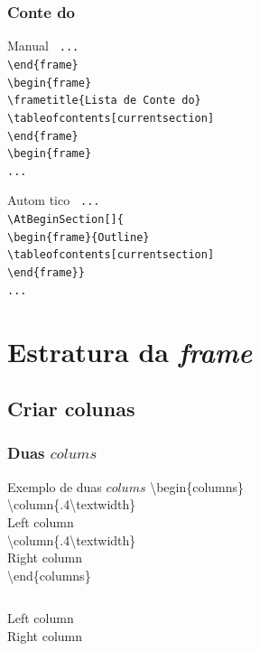 \documentclass{article}
\begin{document}
\begin{frame}
\frametitle{Conte do} 

\begin{block}{Manual}
\scriptsize{\tt{
...\\
\textbackslash end\{frame\}\\
\vspace{0.1cm}
\textbackslash begin\{frame\}\\
\textbackslash frametitle\{Lista de Conte do\}\\
\textbackslash tableofcontents[currentsection]\\
\textbackslash end\{frame\}\\
\vspace{0.2cm}
\textbackslash begin\{frame\}\\
...\\
}}
\end{block}

\begin{block}{Autom tico}
\scriptsize{\tt{
...\\
\textbackslash AtBeginSection[]\{\\
\textbackslash begin\{frame\}\{Outline\}\\
\textbackslash tableofcontents[currentsection]\\
\textbackslash end\{frame\}\}\\
...\\
}}
\end{block}
\end{frame}

\section{Estratura da \emph{frame}}
\subsection{Criar colunas}


\begin{frame}
\frametitle{Duas $colums$}
\begin{block}{Exemplo de duas $colums$}\scriptsize{
\textbackslash begin\{columns\}\\
\textbackslash column\{.4\textbackslash textwidth\}\\
Left column\\
\textbackslash column\{.4\textbackslash textwidth\}\\
Right column\\
\textbackslash end\{columns\}\\
}
\end{block}
\vspace{1cm}
\begin{columns}
Left column\\
Right column\\
\end{columns}
\end{frame}
\end{document}
